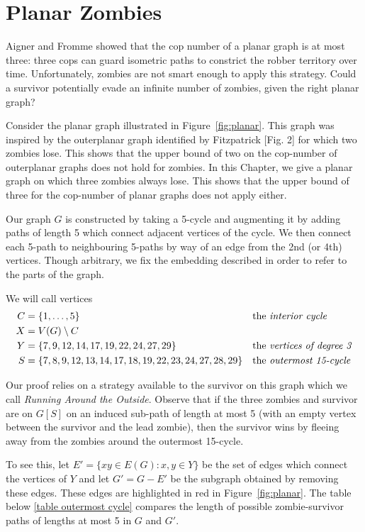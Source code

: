 \chapter{Planar Zombies}\label{chapter planar zombies}

Aigner and Fromme \cite{aigner1984game} showed that the cop number of a planar graph is at most three:
three cops can guard isometric paths to constrict the robber territory over time.
Unfortunately, zombies are not smart enough to apply this strategy. Could a survivor
potentially evade an infinite number of zombies, given the right planar graph?

Consider the planar graph illustrated in Figure~\ref{fig:planar}. This graph was inspired by the outerplanar graph identified by Fitzpatrick \cite{fitzpatrick2016deterministic}[Fig. 2] for which two zombies lose. This shows that the upper bound of two on the cop-number of outerplanar graphs does not hold for zombies. In this Chapter, we give a planar graph on which three zombies always lose. This shows that the upper bound of three for the cop-number of planar graphs does not apply either.

Our graph $G$ is constructed by taking a 5-cycle and augmenting it by adding paths of length 5 which
connect adjacent vertices of the cycle. We then connect each 5-path to neighbouring 5-paths by way of an edge from the 2nd (or 4th) vertices. Though arbitrary, we fix the embedding described in order to refer to the parts of the graph.

We will call vertices
\begin{align*}
C &= \{ 1, \dots, 5 \} && \text{the \textit{interior cycle}} \\
X &= V(G) \setminus C \\
Y &= \{7, 9, 12, 14, 17, 19, 22, 24, 27, 29\} && \text{the \textit{vertices of degree 3}} \\
S &= \{ 7,8,9,12,13,14,17,18,19, 22,23,24,27,28,29 \} && \text{the \textit{outermost 15-cycle}}
\end{align*}

Our proof relies on a strategy available to the survivor on this graph which we call \textit{Running Around the Outside}. Observe that if the three zombies and survivor are on $G[S]$ on an induced sub-path of length at most 5 (with an empty vertex between the survivor and the lead zombie), then the survivor wins by fleeing away from the zombies around the outermost 15-cycle.

To see this, let $E' = \{xy \in E(G) : x, y \in Y\}$ be the set of edges which connect the vertices of $Y$ and let $G' = G - E'$ be the subgraph obtained by removing these edges. These edges are highlighted in red in Figure~\ref{fig:planar}.
The table below \ref{table outermost cycle} compares the length of possible zombie-survivor paths of
lengths at most 5 in $G$ and $G'$.

